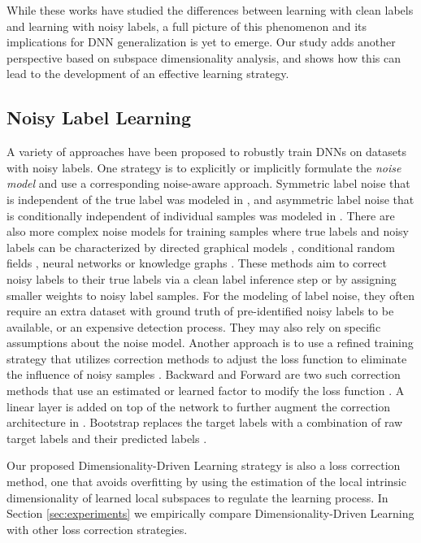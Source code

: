 \documentclass{article}
\begin{document}
While these works have studied the differences between learning with clean labels and learning with noisy labels, a full picture of this phenomenon and its implications for DNN generalization is yet to emerge.   Our study adds another perspective based on subspace dimensionality analysis, and shows how this can lead to the development of an effective learning strategy.   

\subsection{Noisy Label Learning}
A variety of approaches have been proposed to robustly train DNNs on datasets with noisy labels. One strategy is to explicitly or implicitly formulate the {\em noise model} and use a corresponding noise-aware approach. Symmetric label noise that is independent of the true label was modeled in \cite{larsen1998design}, and asymmetric label noise that is conditionally independent of individual samples was modeled in \cite{natarajan2013learning,sukhbaatar2014training}. There are also more complex noise models for training samples where true labels and noisy labels can be characterized by directed graphical models \cite{xiao2015learning}, conditional random fields \cite{vahdat2017toward}, neural networks \cite{veit2017learning,jiang2017mentornet} or knowledge graphs \cite{li2017learning}. These methods aim to correct noisy labels to their true labels via a clean label inference step or by assigning smaller weights to noisy label samples. For the modeling of label noise, they often require an extra dataset with ground truth of pre-identified noisy labels to be available, or an expensive detection process. They may also rely on specific assumptions about the noise model. Another approach is to use a refined training strategy that utilizes correction methods to adjust the loss function to eliminate the influence of noisy samples \citep{Wang_2018_CVPR}. Backward and Forward are two such correction methods that use an estimated or learned factor to modify the loss function \cite{patrini2017making}. A linear layer is added on top of the network to further augment the correction architecture in \cite{sukhbaatar2014learning,goldberger2016training}.  Bootstrap replaces the target labels with a combination of raw target labels and their predicted labels \cite{reed2014training}. 

Our proposed Dimensionality-Driven Learning strategy is also a loss correction method, one that avoids overfitting by using the estimation of the local intrinsic dimensionality of learned local subspaces to regulate the learning process. 
In Section \ref{sec:experiments} we empirically compare Dimensionality-Driven Learning with other loss correction strategies.
\end{document}
